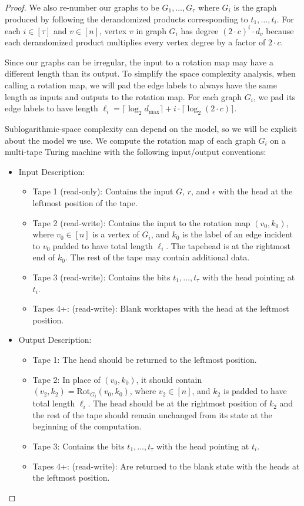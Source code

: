 \documentclass{toc}
\newcommand{\dmax}{d_{\mathrm{max}}}
\numberwithin{myalgctr}{section}
\theoremstyle{named}
\begin{document}
\begin{proof}
We also re-number our graphs to be $G_{1},\ldots, G_{\tau}$ where $G_i$ is the graph produced by following the derandomized products corresponding to $t_1,\ldots, t_i$. For each $i\in[\tau]$ and $v\in[n]$, vertex $v$ in graph $G_i$ has degree $(2\cdot c)^{i}\cdot d_v$ because each derandomized product multiplies every vertex degree by a factor of $2\cdot c$. 

Since our graphs can be irregular, the input to a rotation map may have a different length than its output. To simplify the space complexity analysis, when calling a rotation map, we will pad the edge labels to always have the same length as inputs and outputs to the rotation map. For each graph $G_i$, we pad its edge labels to have length $\ell_i=\lceil{\log_2\dmax}\rceil +i\cdot \lceil{\log_2(2\cdot c)}\rceil$. 

Sublogarithmic-space complexity can depend on the model, so we will be explicit about the model we use. We compute the rotation map of each graph $G_i$ on a multi-tape Turing machine with the following input/output conventions:

\begin{itemize}
\item Input Description:
\begin{itemize}
\item Tape 1 (read-only): Contains the input $G$, $r$, and $\epsilon$ with the head at the leftmost position of the tape.
\item Tape 2 (read-write): Contains the input to the rotation map  $(v_0,k_0)$, where $v_0\in[n]$ is a vertex of $G_i$, and $k_0$ is the label of an edge incident to $v_0$ padded to have total length $\ell_i$. The tapehead is at the rightmost end of $k_0$. The rest of the tape may contain additional data.
\item Tape 3 (read-write): Contains the bits $t_1,\ldots, t_{\tau}$ with the head pointing at $t_i$.
\item Tapes 4+: (read-write): Blank worktapes with the head at the leftmost position.
\end{itemize}

\item Output Description:
\begin{itemize}
\item Tape 1: The head  should be returned to the leftmost position.
\item Tape 2: In place of $(v_0,k_0)$, it should contain $(v_2,k_2)=\mathrm{Rot}_{G_i}(v_0,k_0)$, where $v_2\in[n]$, and $k_2$ is padded to have total length $\ell_i$. The head should be at the rightmost position of $k_2$ and the rest of the tape should remain unchanged from its state at the beginning of the computation.
\item Tape 3: Contains the bits $t_1,\ldots, t_{\tau}$ with the head pointing at $t_i$.
\item Tapes 4+: (read-write): Are returned to the blank state with the heads at the leftmost position.
\end{itemize}
\end{itemize}


\end{proof}
\end{document}
